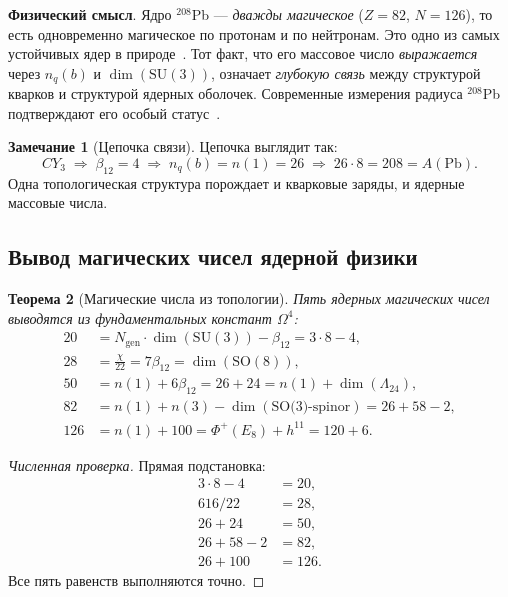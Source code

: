 \documentclass[11pt,a4paper]{article}
\newcommand{\SU}{\ensuremath{\mathrm{SU}}}
\newcommand{\SO}{\ensuremath{\mathrm{SO}}}
\newcommand{\CY}{\ensuremath{CY_3}}
\newcommand{\Om}{\ensuremath{\Omega^4}}
\newcommand{\Ngen}{\ensuremath{N_{\text{gen}}}}
\newtheorem{theorem}{Теорема}[section]
\theoremstyle{definition}
\newtheorem{remark}[theorem]{Замечание}
\begin{document}
\medskip\noindent
\textbf{Физический смысл}.
Ядро $^{208}$Pb --- \emph{дважды магическое} ($Z = 82$, $N = 126$),
то есть одновременно магическое по протонам и по нейтронам.
Это одно из самых устойчивых ядер в природе~\cite{magic-numbers, bohr-mottelson}.
Тот факт, что его массовое число \emph{выражается} через
$n_q(b)$ и $\dim(\SU(3))$, означает \emph{глубокую связь}
между структурой кварков и структурой ядерных оболочек.
Современные измерения радиуса $^{208}$Pb подтверждают
его особый статус~\cite{pb208-review}.

\begin{remark}[Цепочка связи]
\label{rem:b-quark-chain}
Цепочка выглядит так:
\begin{equation}
    \CY \;\Rightarrow\; \beta_{12} = 4
    \;\Rightarrow\; n_q(b) = n(1) = 26
    \;\Rightarrow\; 26 \cdot 8 = 208 = A(\text{Pb}).
\end{equation}
Одна топологическая структура порождает и кварковые заряды,
и ядерные массовые числа.
\end{remark}

\subsection{Вывод магических чисел ядерной физики}
\label{subsec:magic-numbers}

\begin{theorem}[Магические числа из топологии]
\label{thm:magic-numbers}
Пять ядерных магических чисел выводятся из фундаментальных
констант $\Om$:
\begin{align}
    20  &= \Ngen \cdot \dim(\SU(3)) - \beta_{12}
          = 3 \cdot 8 - 4, \label{eq:magic-20} \\[0.3em]
    28  &= \frac{\chi}{22} = 7 \beta_{12}
          = \dim(\SO(8)), \label{eq:magic-28} \\[0.3em]
    50  &= n(1) + 6 \beta_{12}
          = 26 + 24 = n(1) + \dim(\Lambda_{24}), \label{eq:magic-50} \\[0.3em]
    82  &= n(1) + n(3) - \dim(\text{SO(3)-spinor})
          = 26 + 58 - 2, \label{eq:magic-82} \\[0.3em]
    126 &= n(1) + 100 = \Phi^+(E_8) + h^{11}
          = 120 + 6. \label{eq:magic-126}
\end{align}
\end{theorem}

\begin{proof}[Численная проверка]
Прямая подстановка:
\begin{align}
    3 \cdot 8 - 4 &= 20, \\
    616 / 22 &= 28, \\
    26 + 24 &= 50, \\
    26 + 58 - 2 &= 82, \\
    26 + 100 &= 126.
\end{align}
Все пять равенств выполняются точно.
\end{proof}
\end{document}
